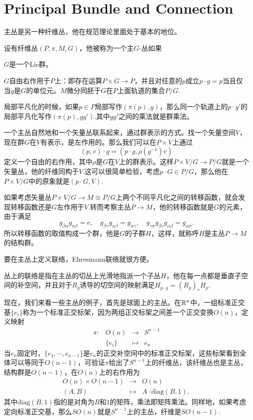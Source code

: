 \section{Principal Bundle and Connection}
主丛是另一种纤维丛，他在规范理论里面处于基本的地位。

\para 设有纤维丛$(P,\pi,M,G)$，他被称为一个主$G$-丛如果

	 $G$是一个Lie群。

	 $G$自由右作用于$P$上：即存在运算$P\times G\to P$，并且对任意的$p$成立$p\cdot g=p$当且仅当$g$是$G$的单位元。$M$微分同胚于$G$在$P$上面轨道的集合$P/G$.

	 局部平凡化的时候，如果$p\in P$局部写作$(\pi(p),g)$，那么同一个轨道上的$p\cdot g'$的局部平凡化写作$(\pi(p),gg')$.其中$gg'$之间的乘法就是群乘法。


一个主丛自然地和一个矢量丛联系起来，通过群表示的方式。找一个矢量空间$V$，现在群$G$在$V$有表示，是左作用的。那么我们可以在$P\times V$上通过
\[
	(p,v)\cdot g=(p\cdot g,\rho(g^{-1})v)
\]
定义一个自由的右作用，其中$\rho$是$G$在$V$上的群表示。这样$P\times V/G\to P/G$就是一个矢量丛，他的纤维同构于$V$.这可以很简单检验，考虑$p\cdot G\in P/G$，那么他在$P\times V/G$中的原象就是$(p\cdot G,V)$.

如果考虑矢量丛$P\times V/G\to M\cong P/G$上两个不同平凡化之间的转移函数，就会发现转移函数还是$G$左作用于$V$.转而考察主丛$P\to M$，他的转移函数就是$G$的元素，由于满足
\begin{equation*}
	g_{\beta\alpha}g_{\alpha\beta}=e,\quad g_{\beta\gamma}g_{\alpha\beta}=g_{\alpha\gamma},\quad g_{\gamma\sigma}g_{\beta\gamma}g_{\alpha\beta}=g_{\alpha\sigma}.
\end{equation*}
所以转移函数的取值构成一个群，他是$G$的子群$H$，这样，就称呼$H$是主丛$P\to M$的结构群。

要在主丛上定义联络，Ehresmann联络就很方便。

\para 丛上的联络是指在主丛的切丛上光滑地指派一个子丛$H$，他在每一点都是垂直子空间的补空间，并且对于$R_g$诱导的切空间的映射满足$H_{p\cdot g}=(R_g)_*H_p$.


现在，我们来看一些主丛的例子，首先是球面上的主丛。在$\mathbb{R}^n$中，一组标准正交基$\{e_i\}$称为一个标准正交标架，因为两组正交标架之间差一个正交变换$O(n)$，定义映射
\[
	\begin{array}{lccl}
		\pi:&O(n)&\to &S^{n-1}\\
		&\{e_i\}&\mapsto&e_n
	\end{array}
\]
当$e_n$固定时，$\{e_1,\cdots,e_{n-1}\}$是$e_n$的正交补空间中的标准正交标架，这些标架看到全体可以等同于$O(n-1)$，可验证$\pi$给出了$S^{n-1}$上的纤维丛，该纤维丛也是主丛，结构群是$O(n-1)$，在$O(n)$上的右作用为
\[
	\begin{array}{lcl}
		O(n)\times O(n-1)&\to& O(n)\\
		(A,B)&\mapsto& A\cdot \mathrm{diag}(B,1),
	\end{array}
\]
其中$\mathrm{diag}(B,1)$指的是对角为$B$和$1$的矩阵，乘法即矩阵乘法。同样地，如果考虑定向标准正交基，那么$SO(n)$就是$S^{n-1}$上的主丛，纤维是$SO(n-1)$.

